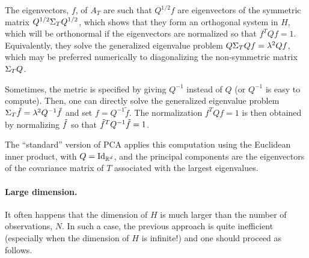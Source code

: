 The eigenvectors, $f$, of $A_T$ are such that $Q^{1/2}f$ are eigenvectors of the symmetric matrix $Q^{1/2} \Sigma_T Q^{1/2}$, which shows that they form an orthogonal system in $H$, which will be orthonormal if the eigenvectors are normalized so that $f^T Q f =1$. Equivalently, they solve the generalized eigenvalue problem $Q\Sigma_T Q f = \lambda^2 Q f$, which may be preferred numerically to  diagonalizing the non-symmetric matrix $\Sigma_T Q$.

\begin{remark}
Sometimes, the metric is specified by giving $Q^{-1}$ instead of $Q$ (or $Q^{-1}$ is easy to compute). Then, one can directly solve the generalized eigenvalue problem  $\Sigma_T \tilde f = \lambda^2 Q^{-1} \tilde f$ and set $f = Q^{-1} \tilde f$. The normalization $f^T Q f = 1$ is then obtained by normalizing ${\tilde{f}}$ so that  $\tilde f^T Q^{-1}{\tilde{f}}=1$. 
\end{remark}

\begin{remark}
The ``standard'' version of PCA applies this computation using the Euclidean inner product, with $Q = \Id_{\mR^d}$, and the principal components are the eigenvectors of the covariance matrix of $T$ associated with the largest eigenvalues.
\end{remark}

\paragraph{Large dimension.}
It often happens that the dimension of $H$ is much larger than the
number of observations, $N$. In such a case, the previous approach is
quite inefficient (especially when the dimension of $H$ is infinite!)  and one should proceed as follows. 

